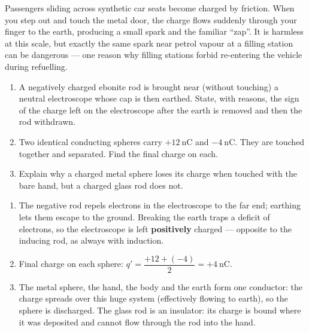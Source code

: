 \documentclass[11pt]{article}
\begin{document}
\begin{savaistu}
Passengers sliding across synthetic car seats become charged by friction. When you step out and touch the metal door, the charge flows suddenly through your finger to the earth, producing a small spark and the familiar ``zap''. It is harmless at this scale, but exactly the same spark near petrol vapour at a filling station can be dangerous --- one reason why filling stations forbid re-entering the vehicle during refuelling.
\end{savaistu}

\begin{exercice}
\begin{enumerate}
\item A negatively charged ebonite rod is brought near (without touching) a neutral electroscope whose cap is then earthed. State, with reasons, the sign of the charge left on the electroscope after the earth is removed and then the rod withdrawn.
\item Two identical conducting spheres carry $+12\ \mathrm{nC}$ and $-4\ \mathrm{nC}$. They are touched together and separated. Find the final charge on each.
\item Explain why a charged metal sphere loses its charge when touched with the bare hand, but a charged glass rod does not.
\end{enumerate}
\end{exercice}

\begin{corrige}[Exercise 1]
\begin{enumerate}
\item The negative rod repels electrons in the electroscope to the far end; earthing lets them escape to the ground. Breaking the earth traps a deficit of electrons, so the electroscope is left \textbf{positively} charged --- opposite to the inducing rod, as always with induction.
\item Final charge on each sphere: $q' = \dfrac{+12 + (-4)}{2} = +4\ \mathrm{nC}$.
\item The metal sphere, the hand, the body and the earth form one conductor: the charge spreads over this huge system (effectively flowing to earth), so the sphere is discharged. The glass rod is an insulator: its charge is bound where it was deposited and cannot flow through the rod into the hand.
\end{enumerate}
\end{corrige}
\end{document}

